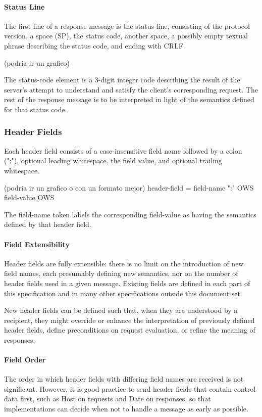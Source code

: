   
\paragraph{Status Line}
The first line of a response message is the status-line, consisting
   of the protocol version, a space (SP), the status code, another
   space, a possibly empty textual phrase describing the status code,
   and ending with CRLF.

   (podria ir un grafico)

   The status-code element is a 3-digit integer code describing the
   result of the server's attempt to understand and satisfy the client's
   corresponding request.  The rest of the response message is to be
   interpreted in light of the semantics defined for that status code.
  


\subsubsection {Header Fields}
Each header field consists of a case-insensitive field name followed
by a colon (":"), optional leading whitespace, the field value, and
optional trailing whitespace.

(podria ir un grafico o con un formato mejor)
header-field   = field-name ":" OWS field-value OWS

The field-name token labels the corresponding field-value as having
the semantics defined by that header field.  

\paragraph{Field Extensibility}
Header fields are fully extensible: there is no limit on the
introduction of new field names, each presumably defining new
semantics, nor on the number of header fields used in a given
message.  Existing fields are defined in each part of this
specification and in many other specifications outside this document
set.

New header fields can be defined such that, when they are understood
by a recipient, they might override or enhance the interpretation of
previously defined header fields, define preconditions on request
evaluation, or refine the meaning of responses.

\paragraph{Field Order}
The order in which header fields with differing field names are
   received is not significant.  However, it is good practice to send
   header fields that contain control data first, such as Host on
   requests and Date on responses, so that implementations can decide
   when not to handle a message as early as possible. 


